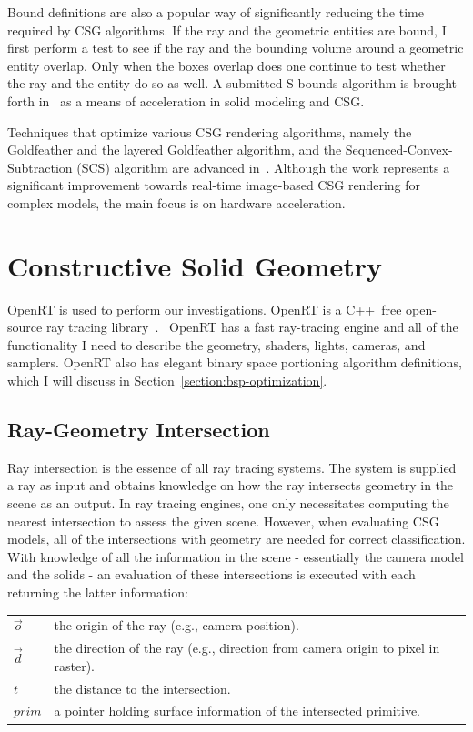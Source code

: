\documentclass[a4paper,11pt,oneside]{article}
\makeatletter
\newenvironment{conditions}
  {\par\vspace{\abovedisplayskip}\noindent\begin{tabular}{>{$}l<{$} @{${}={}$} l}}
  {\end{tabular}\par\vspace{\belowdisplayskip}}
\makeatother
\begin{document}
Bound definitions are also a popular way of significantly reducing the time required by CSG algorithms. If the ray and the geometric entities are bound, I first perform a test to see if the ray and the bounding volume around a geometric entity overlap. Only when the boxes overlap does one continue to test whether the ray and the entity do so as well. A submitted S-bounds algorithm is brought forth in~\cite{sbounds_csg} as a means of acceleration in solid modeling and CSG.
  
Techniques that optimize various CSG rendering algorithms, namely the Goldfeather and the layered Goldfeather algorithm, and the Sequenced-Convex- Subtraction (SCS) algorithm are advanced in~\cite{hardware_accelerated_image_based_csg.}. Although the work represents a significant improvement towards real-time image-based CSG rendering for complex models,  the main focus is on hardware acceleration.

  

\section{Constructive Solid Geometry}
    
OpenRT is used to perform our investigations. OpenRT is a C++ free open-source ray tracing library~\cite{openrt}.  OpenRT has a fast ray-tracing engine and all of the functionality I need to describe the geometry, shaders, lights, cameras, and samplers. OpenRT also has elegant binary space portioning algorithm definitions, which I will discuss in Section~\ref{section:bsp-optimization}.
    
\subsection{Ray-Geometry Intersection}
\label{section:ray-intersection}

Ray intersection is the essence of all ray tracing systems. The system is supplied a ray as input and obtains knowledge on how the ray intersects geometry in the scene as an output. In ray tracing engines, one only necessitates computing the nearest intersection to assess the given scene. However, when evaluating CSG models, all of the intersections with geometry are needed for correct classification. With knowledge of all the information in the scene - essentially the camera model and the solids - an evaluation of these intersections is executed with each returning the latter information:

\begin{conditions}
	\vec{o}     & the origin of the ray (e.g., camera position). \\
	\vec{d}     & the direction of the ray (e.g., direction from camera origin to pixel in raster). \\
	t     &  the distance to the intersection. \\
	prim    &  a pointer holding surface information of the intersected primitive. 
\end{conditions}
\end{document}
